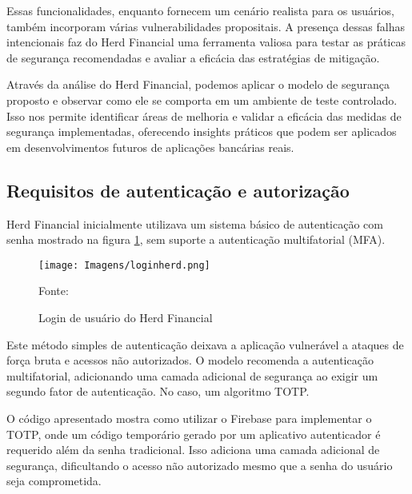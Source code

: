     Essas funcionalidades, enquanto fornecem um cenário realista para os usuários, também incorporam várias vulnerabilidades propositais. A presença dessas falhas intencionais faz do Herd Financial uma ferramenta valiosa para testar as práticas de segurança recomendadas e avaliar a eficácia das estratégias de mitigação.

    Através da análise do Herd Financial, podemos aplicar o modelo de segurança proposto e observar como ele se comporta em um ambiente de teste controlado. Isso nos permite identificar áreas de melhoria e validar a eficácia das medidas de segurança implementadas, oferecendo insights práticos que podem ser aplicados em desenvolvimentos futuros de aplicações bancárias reais.

    \subsection{Requisitos de autenticação e autorização}
    Herd Financial inicialmente utilizava um sistema básico de autenticação com senha mostrado na figura \ref{login}, sem suporte a autenticação multifatorial (MFA).

    \begin{figure}[H]
    \centering 
    \texttt{[image: Imagens/loginherd.png]} 
    \caption{Login de usuário do Herd Financial}
    Fonte: 
    \label{login}
    
    \end{figure}

    Este método simples de autenticação deixava a aplicação vulnerável a ataques de força bruta e acessos não autorizados. O modelo recomenda a autenticação multifatorial, adicionando uma camada adicional de segurança ao exigir um segundo fator de autenticação. No caso, um algoritmo TOTP.

    O código apresentado mostra como utilizar o Firebase para implementar o TOTP, onde um código temporário gerado por um aplicativo autenticador é requerido além da senha tradicional. Isso adiciona uma camada adicional de segurança, dificultando o acesso não autorizado mesmo que a senha do usuário seja comprometida.
    \\

